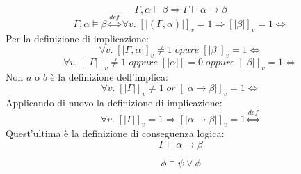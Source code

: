 \documentclass{article}
\theoremstyle{break}
\theoremstyle{break}
\theoremstyle{break}
\theoremstyle{break}
\begin{document}
\begin{exercise}[a casa]
	\[
		\Gamma,\alpha \models \beta \Rightarrow \Gamma \models \alpha \to \beta
	\]
    \[
        \Gamma,\alpha \models \beta \stackrel{def}{\Leftrightarrow} \forall v.\; [|(\Gamma,\alpha)|]_v=1 \Rightarrow [|\beta|]_v=1 \Leftrightarrow
    \]
    Per la definizione di implicazione:
    \[
        \forall v.\; [|\Gamma,\alpha|]_v \neq 1\; opure\; [|\beta|]_v=1 \Leftrightarrow
    \] 
    \[
        \forall v.\; [|\Gamma|]_v \neq 1\; oppure\; [|\alpha|] = 0\; oppure\; [|\beta|]_v=1 \Leftrightarrow
    \] 
    Non \( a \) o \( b \) è la definizione dell'implica:
    \[
        \forall v.\; [|\Gamma|]_v \neq 1\; or\; [|\alpha \to \beta|]_v=1 \Leftrightarrow
    \] 
    Applicando di nuovo la definizione di implicazione:
    \[
        \forall v.\; [|\Gamma|]_v=1 \Rightarrow [|\alpha \to \beta|]_v=1 \stackrel{def}{\Leftrightarrow}
    \] 
    Quest'ultima è la definizione di conseguenza logica:
    \[
    \Gamma \models \alpha \to \beta
    \] 
\end{exercise}
\begin{exercise}[a casa]
	\[
		\phi \models \psi \vee \phi
	\]
\end{exercise}
\end{document}
